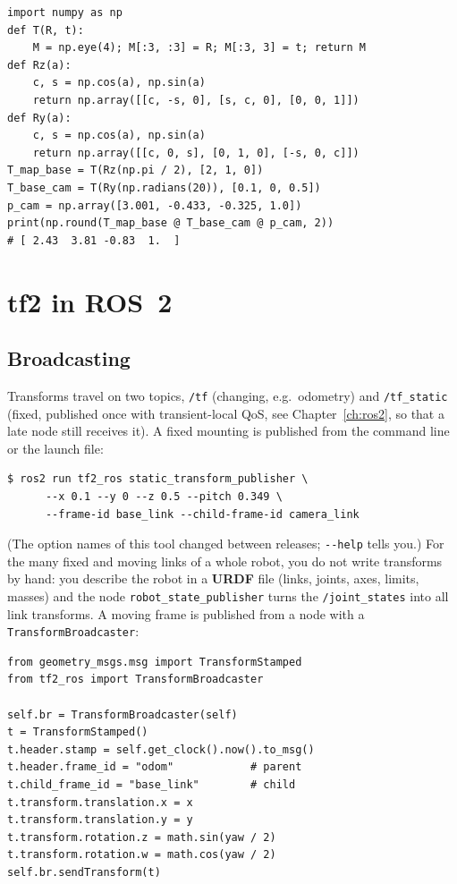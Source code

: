 \begin{verbatim}
import numpy as np
def T(R, t):
    M = np.eye(4); M[:3, :3] = R; M[:3, 3] = t; return M
def Rz(a):
    c, s = np.cos(a), np.sin(a)
    return np.array([[c, -s, 0], [s, c, 0], [0, 0, 1]])
def Ry(a):
    c, s = np.cos(a), np.sin(a)
    return np.array([[c, 0, s], [0, 1, 0], [-s, 0, c]])
T_map_base = T(Rz(np.pi / 2), [2, 1, 0])
T_base_cam = T(Ry(np.radians(20)), [0.1, 0, 0.5])
p_cam = np.array([3.001, -0.433, -0.325, 1.0])
print(np.round(T_map_base @ T_base_cam @ p_cam, 2))
# [ 2.43  3.81 -0.83  1.  ]
\end{verbatim}

\section*{tf2 in ROS~2}
\subsection*{Broadcasting}
Transforms travel on two topics, \verb!/tf! (changing, e.g.\ odometry) and \verb!/tf_static! (fixed, published once with transient-local QoS, see Chapter~\ref{ch:ros2}, so that a late node still receives it). A fixed mounting is published from the command line or the launch file:
\begin{verbatim}
$ ros2 run tf2_ros static_transform_publisher \
      --x 0.1 --y 0 --z 0.5 --pitch 0.349 \
      --frame-id base_link --child-frame-id camera_link
\end{verbatim}
(The option names of this tool changed between releases; \verb!--help! tells you.) For the many fixed and moving links of a whole robot, you do not write transforms by hand: you describe the robot in a \textbf{URDF} file (links, joints, axes, limits, masses) and the node \verb!robot_state_publisher! turns the \verb!/joint_states! into all link transforms. A moving frame is published from a node with a \verb!TransformBroadcaster!:
\begin{verbatim}
from geometry_msgs.msg import TransformStamped
from tf2_ros import TransformBroadcaster

self.br = TransformBroadcaster(self)
t = TransformStamped()
t.header.stamp = self.get_clock().now().to_msg()
t.header.frame_id = "odom"            # parent
t.child_frame_id = "base_link"        # child
t.transform.translation.x = x
t.transform.translation.y = y
t.transform.rotation.z = math.sin(yaw / 2)
t.transform.rotation.w = math.cos(yaw / 2)
self.br.sendTransform(t)
\end{verbatim}
